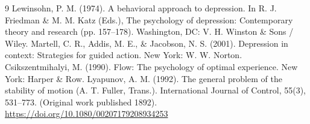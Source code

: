 \documentclass[10pt]{article}
\theoremstyle{remark}
\begin{document}
\begin{thebibliography}{9}
 Lewinsohn, P. M. (1974). A behavioral approach to depression. In R. J. Friedman \& M. M. Katz (Eds.), The psychology of depression: Contemporary theory and research (pp. 157--178). Washington, DC: V. H. Winston \& Sons / Wiley.
 Martell, C. R., Addis, M. E., \& Jacobson, N. S. (2001). Depression in context: Strategies for guided action. New York: W. W. Norton.
 Csikszentmihalyi, M. (1990). Flow: The psychology of optimal experience. New York: Harper \& Row.
 Lyapunov, A. M. (1992). The general problem of the stability of motion (A. T. Fuller, Trans.). International Journal of Control, 55(3), 531--773. (Original work published 1892). \url{https://doi.org/10.1080/00207179208934253}
\end{thebibliography}
\endgroup
\end{document}
